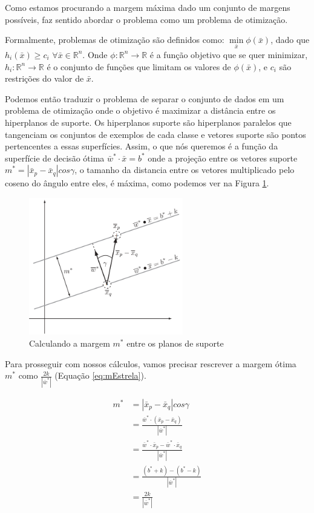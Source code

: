 Como estamos procurando a margem máxima dado um conjunto de margens possíveis, faz sentido abordar o problema como um problema de otimização.

Formalmente, problemas de otimização são definidos como: $\underset{\bar{x}}{\min}\phi(\bar{x})$, dado que $h_i(\bar{x})\ge c_i$ $\forall \bar{x} \in \mathbb{R}^n$. Onde $\phi: \mathbb{R}^n\rightarrow \mathbb{R}$ é a função objetivo que se quer minimizar, $h_i:\mathbb{R}^n\rightarrow\mathbb{R}$ é o conjunto de funções que limitam os valores de $\phi(\bar{x})$, e $c_i$ são restrições do valor de $\bar{x}$.

Podemos então traduzir o problema de separar o conjunto de dados em um problema de otimização onde o objetivo é maximizar a distância entre os hiperplanos de suporte. Os hiperplanos suporte são hiperplanos paralelos que tangenciam os conjuntos de exemplos de cada classe e vetores suporte são pontos pertencentes a essas superfícies. Assim, o que nós queremos é a função da superfície de decisão ótima $\bar{w}^*\cdot\bar{x}=b^*$ onde a projeção entre os vetores suporte $m^*=|\bar{x}_p - \bar{x}_q|cos\gamma$, o tamanho da distancia entre os vetores multiplicado pelo coseno do ângulo entre eles, é máxima, como podemos ver na Figura \ref{fig:LABEL_FIG_4}. 

\begin{figure}
  \centering
  \includegraphics[width=0.6\textwidth]{imagens/svm_4.png}
  \caption{Calculando a margem $m^*$ entre os planos de suporte\cite{art:LIVRO_SVM}}
  \label{fig:LABEL_FIG_4}
\end{figure}

Para prosseguir com nossos cálculos, vamos precisar rescrever a margem ótima $m^*$ como $\frac{2k}{|\bar{w}^*|}$ (Equação \ref{eq:mEstrela}).

\begin{equation} \label{eq:mEstrela}
\begin{split}
m^* &= |\bar{x}_p-\bar{x}_q|cos\gamma\\
    &= \frac{\bar{w}^*\cdot(\bar{x}_p-\bar{x}_q)}{|\bar{w}^*|}\\
    &= \frac{\bar{w}^*\cdot\bar{x}_p-\bar{w}^*\cdot\bar{x}_q}{|\bar{w}^*|}\\
    &= \frac{(b^*+k)-(b^*-k)}{|\bar{w}^*|}\\
    &= \frac{2k}{|\bar{w}^*|}
\end{split}
\end{equation}

